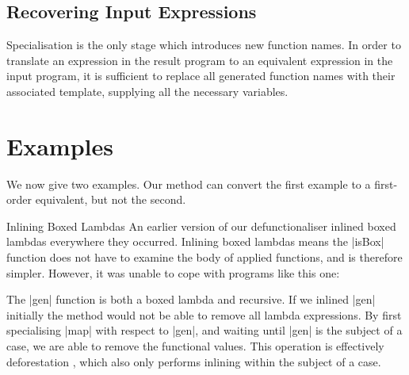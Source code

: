 \documentclass[preprint]{sigplanconf}
\begin{document}
\subsection{Recovering Input Expressions}

Specialisation is the only stage which introduces new function names. In order to translate an expression in the result program to an equivalent expression in the input program, it is sufficient to replace all generated function names with their associated template, supplying all the necessary variables.

\section{Examples}
\label{sec:examples}

We now give two examples. Our method can convert the first example to a first-order equivalent, but not the second.

\begin{examplename}{Inlining Boxed Lambdas}
\label{ex:inlining_boxed_lambdas}
An earlier version of our defunctionaliser inlined boxed lambdas everywhere they occurred. Inlining boxed lambdas means the |isBox| function does not have to examine the body of applied functions, and is therefore simpler. However, it was unable to cope with programs like this one:


The |gen| function is both a boxed lambda and recursive. If we inlined |gen| initially the method would not be able to remove all lambda expressions. By first specialising |map| with respect to |gen|, and waiting until |gen| is the subject of a case, we are able to remove the functional values. This operation is effectively deforestation \cite{wadler:deforestation}, which also only performs inlining within the subject of a case.
\end{examplename}
\end{document}
